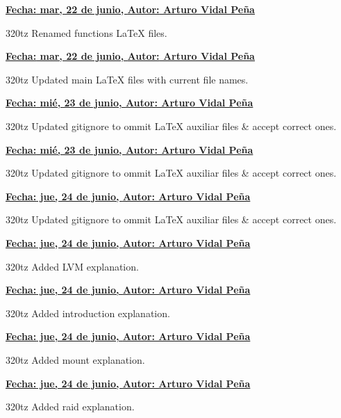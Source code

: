 \item \textbf{\underline{\underline{Fecha:} mar, 22 de junio, \underline{Autor:} Arturo Vidal Peña}}\\\item[]320tz Renamed functions LaTeX files.\\
\item \textbf{\underline{\underline{Fecha:} mar, 22 de junio, \underline{Autor:} Arturo Vidal Peña}}\\\item[]320tz Updated main LaTeX files with current file names.\\
\item \textbf{\underline{\underline{Fecha:} mié, 23 de junio, \underline{Autor:} Arturo Vidal Peña}}\\\item[]320tz Updated gitignore to ommit LaTeX auxiliar files \& accept correct ones.\\
\item \textbf{\underline{\underline{Fecha:} mié, 23 de junio, \underline{Autor:} Arturo Vidal Peña}}\\\item[]320tz Updated gitignore to ommit LaTeX auxiliar files \& accept correct ones.\\
\item \textbf{\underline{\underline{Fecha:} jue, 24 de junio, \underline{Autor:} Arturo Vidal Peña}}\\\item[]320tz Updated gitignore to ommit LaTeX auxiliar files \& accept correct ones.\\
\item \textbf{\underline{\underline{Fecha:} jue, 24 de junio, \underline{Autor:} Arturo Vidal Peña}}\\\item[]320tz Added LVM explanation.\\
\item \textbf{\underline{\underline{Fecha:} jue, 24 de junio, \underline{Autor:} Arturo Vidal Peña}}\\\item[]320tz Added introduction explanation.\\
\item \textbf{\underline{\underline{Fecha:} jue, 24 de junio, \underline{Autor:} Arturo Vidal Peña}}\\\item[]320tz Added mount explanation.\\
\item \textbf{\underline{\underline{Fecha:} jue, 24 de junio, \underline{Autor:} Arturo Vidal Peña}}\\\item[]320tz Added raid explanation.\\
